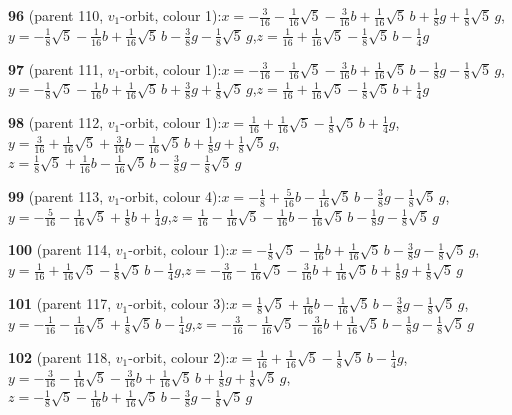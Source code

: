 \documentclass[10pt]{article}
\begin{document}
{\noindent\textbf{96} (parent 110, $v_1$-orbit, colour 1):\quad $x=-\tfrac{3}{16}-\tfrac{1}{16}\sqrt5-\tfrac{3}{16}b+\tfrac{1}{16}\sqrt5\,b+\tfrac{1}{8}g+\tfrac{1}{8}\sqrt5\,g$,\quad $y=-\tfrac{1}{8}\sqrt5-\tfrac{1}{16}b+\tfrac{1}{16}\sqrt5\,b-\tfrac{3}{8}g-\tfrac{1}{8}\sqrt5\,g$,\quad $z=\tfrac{1}{16}+\tfrac{1}{16}\sqrt5-\tfrac{1}{8}\sqrt5\,b-\tfrac{1}{4}g$\par\smallskip
\noindent\textbf{97} (parent 111, $v_1$-orbit, colour 1):\quad $x=-\tfrac{3}{16}-\tfrac{1}{16}\sqrt5-\tfrac{3}{16}b+\tfrac{1}{16}\sqrt5\,b-\tfrac{1}{8}g-\tfrac{1}{8}\sqrt5\,g$,\quad $y=-\tfrac{1}{8}\sqrt5-\tfrac{1}{16}b+\tfrac{1}{16}\sqrt5\,b+\tfrac{3}{8}g+\tfrac{1}{8}\sqrt5\,g$,\quad $z=\tfrac{1}{16}+\tfrac{1}{16}\sqrt5-\tfrac{1}{8}\sqrt5\,b+\tfrac{1}{4}g$\par\smallskip
\noindent\textbf{98} (parent 112, $v_1$-orbit, colour 1):\quad $x=\tfrac{1}{16}+\tfrac{1}{16}\sqrt5-\tfrac{1}{8}\sqrt5\,b+\tfrac{1}{4}g$,\quad $y=\tfrac{3}{16}+\tfrac{1}{16}\sqrt5+\tfrac{3}{16}b-\tfrac{1}{16}\sqrt5\,b+\tfrac{1}{8}g+\tfrac{1}{8}\sqrt5\,g$,\quad $z=\tfrac{1}{8}\sqrt5+\tfrac{1}{16}b-\tfrac{1}{16}\sqrt5\,b-\tfrac{3}{8}g-\tfrac{1}{8}\sqrt5\,g$\par\smallskip
\noindent\textbf{99} (parent 113, $v_1$-orbit, colour 4):\quad $x=-\tfrac{1}{8}+\tfrac{5}{16}b-\tfrac{1}{16}\sqrt5\,b-\tfrac{3}{8}g-\tfrac{1}{8}\sqrt5\,g$,\quad $y=-\tfrac{5}{16}-\tfrac{1}{16}\sqrt5+\tfrac{1}{8}b+\tfrac{1}{4}g$,\quad $z=\tfrac{1}{16}-\tfrac{1}{16}\sqrt5-\tfrac{1}{16}b-\tfrac{1}{16}\sqrt5\,b-\tfrac{1}{8}g-\tfrac{1}{8}\sqrt5\,g$\par\smallskip
\noindent\textbf{100} (parent 114, $v_1$-orbit, colour 1):\quad $x=-\tfrac{1}{8}\sqrt5-\tfrac{1}{16}b+\tfrac{1}{16}\sqrt5\,b-\tfrac{3}{8}g-\tfrac{1}{8}\sqrt5\,g$,\quad $y=\tfrac{1}{16}+\tfrac{1}{16}\sqrt5-\tfrac{1}{8}\sqrt5\,b-\tfrac{1}{4}g$,\quad $z=-\tfrac{3}{16}-\tfrac{1}{16}\sqrt5-\tfrac{3}{16}b+\tfrac{1}{16}\sqrt5\,b+\tfrac{1}{8}g+\tfrac{1}{8}\sqrt5\,g$\par\smallskip
\noindent\textbf{101} (parent 117, $v_1$-orbit, colour 3):\quad $x=\tfrac{1}{8}\sqrt5+\tfrac{1}{16}b-\tfrac{1}{16}\sqrt5\,b-\tfrac{3}{8}g-\tfrac{1}{8}\sqrt5\,g$,\quad $y=-\tfrac{1}{16}-\tfrac{1}{16}\sqrt5+\tfrac{1}{8}\sqrt5\,b-\tfrac{1}{4}g$,\quad $z=-\tfrac{3}{16}-\tfrac{1}{16}\sqrt5-\tfrac{3}{16}b+\tfrac{1}{16}\sqrt5\,b-\tfrac{1}{8}g-\tfrac{1}{8}\sqrt5\,g$\par\smallskip
\noindent\textbf{102} (parent 118, $v_1$-orbit, colour 2):\quad $x=\tfrac{1}{16}+\tfrac{1}{16}\sqrt5-\tfrac{1}{8}\sqrt5\,b-\tfrac{1}{4}g$,\quad $y=-\tfrac{3}{16}-\tfrac{1}{16}\sqrt5-\tfrac{3}{16}b+\tfrac{1}{16}\sqrt5\,b+\tfrac{1}{8}g+\tfrac{1}{8}\sqrt5\,g$,\quad $z=-\tfrac{1}{8}\sqrt5-\tfrac{1}{16}b+\tfrac{1}{16}\sqrt5\,b-\tfrac{3}{8}g-\tfrac{1}{8}\sqrt5\,g$\par\smallskip
}
\end{document}
